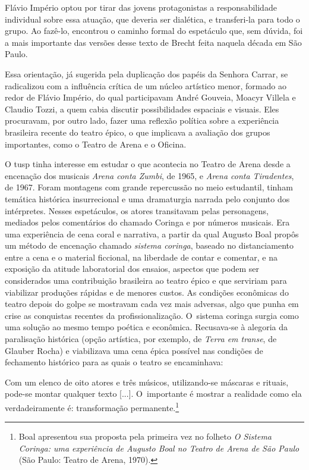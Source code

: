 Flávio Império optou por tirar das jovens protagonistas a
responsabilidade individual sobre essa atuação, que deveria ser
dialética, e transferi-la para todo o grupo. Ao fazê-lo, encontrou o
caminho formal do espetáculo que, sem dúvida, foi a mais importante das
versões desse texto de Brecht feita naquela década em São Paulo.

Essa orientação, já sugerida pela duplicação dos papéis da Senhora
Carrar, se radicalizou com a influência crítica de um núcleo
artístico menor, formado ao redor de Flávio Império, do qual
participavam André Gouveia, Moacyr Villela e Claudio Tozzi, a quem cabia
discutir possibilidades espaciais e visuais. Eles procuravam, por outro
lado, fazer uma reflexão política sobre a experiência brasileira recente
do teatro épico, o que implicava a avaliação dos grupos importantes,
como o Teatro de Arena e o Oficina.

O {\sc tusp} tinha interesse em estudar o que acontecia no Teatro de Arena
desde a encenação dos musicais {\it Arena conta Zumbi}, de 1965, e
{\it Arena conta Tiradentes}, de 1967. Foram montagens com grande
repercussão no meio estudantil, tinham temática histórica insurrecional
e uma dramaturgia narrada pelo conjunto dos intérpretes. Nesses
espetáculos, os atores transitavam pelas personagens, mediados pelos
comentários do chamado Coringa e por números musicais. Era uma
experiência de cena coral e narrativa, a partir da qual Augusto Boal
propôs um método de encenação chamado {\it sistema coringa}, baseado no
distanciamento entre a cena e o material ficcional, na liberdade de
contar e comentar, e na exposição da atitude laboratorial dos ensaios,
aspectos que podem ser considerados uma contribuição brasileira ao
teatro épico e que serviriam para viabilizar produções rápidas e de
menores custos. As condições econômicas do teatro depois do golpe se
mostravam cada vez mais adversas, algo que punha em crise as conquistas
recentes da profissionalização. O~sistema coringa surgia como uma
solução ao mesmo tempo poética e econômica. Recusava-se à alegoria da
paralisação histórica (opção artística, por exemplo, de {\it Terra em
transe}, de Glauber Rocha) e viabilizava uma cena épica possível nas
condições de fechamento histórico para as quais o teatro se encaminhava:

\startblockquote
Com um elenco de oito atores e três músicos, utilizando-se máscaras e
rituais, pode-se montar qualquer texto {[}...{]}. O~importante é mostrar
a realidade como ela verdadeiramente é: transformação
permanente.\footnote{Boal apresentou sua proposta pela primeira vez no
  folheto {\it O Sistema Coringa: uma experiência de Augusto Boal no
  Teatro de Arena de São Paulo} (São Paulo: Teatro de Arena, 1970).}
\stopblockquote

